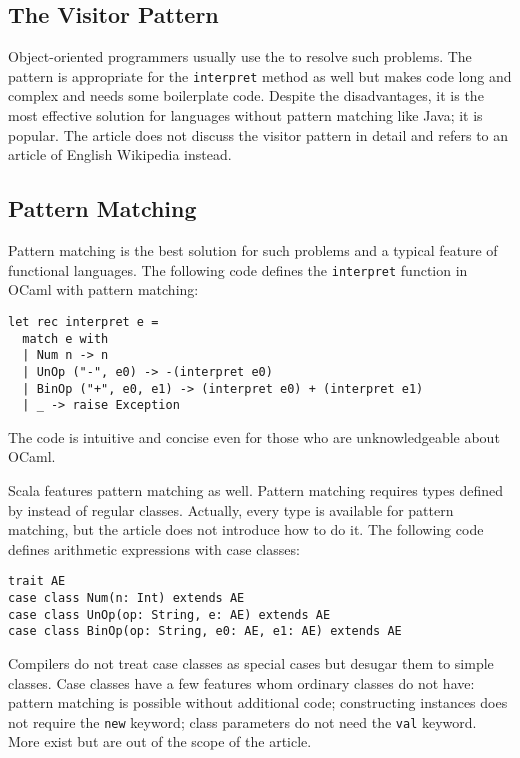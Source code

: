 \subsection{The Visitor Pattern}

Object-oriented programmers usually use the   to
resolve such problems. The pattern is appropriate for the \verb!interpret! method
as well but makes code long and complex and needs some boilerplate code. Despite
the disadvantages, it is the most effective solution for languages without
pattern matching like Java; it is popular. The article does not discuss the
visitor pattern in detail and refers to an article of English
Wikipedia instead.

\subsection{Pattern Matching}

Pattern matching is the best solution for such problems and a typical feature of
functional languages. The following code defines the \verb!interpret! function in
OCaml with pattern matching:

\begin{verbatim}
let rec interpret e =
  match e with
  | Num n -> n
  | UnOp ("-", e0) -> -(interpret e0)
  | BinOp ("+", e0, e1) -> (interpret e0) + (interpret e1)
  | _ -> raise Exception
\end{verbatim}

The code is intuitive and concise even for those who are unknowledgeable about
OCaml.

Scala features pattern matching as well. Pattern matching requires types defined
by   instead of regular classes. Actually, every type is
available for pattern matching, but the article does not introduce how to do it.
The following code defines arithmetic expressions with case classes:

\begin{verbatim}
trait AE
case class Num(n: Int) extends AE
case class UnOp(op: String, e: AE) extends AE
case class BinOp(op: String, e0: AE, e1: AE) extends AE
\end{verbatim}

Compilers do not treat case classes as special cases but desugar them to simple
classes. Case classes have a few features whom ordinary classes do not have:
pattern matching is possible without additional code; constructing instances does
not require the \verb!new! keyword; class parameters do not need the \verb!val!
keyword. More exist but are out of the scope of the article.

